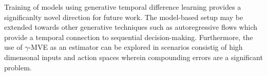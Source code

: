 \documentclass[11pt,letterpaper]{article}
\begin{document}
Training of models using generative temporal difference learning provides a significanlty novel direction for future work. The model-based setup may be extended towards other generative techniques such as autoregressive flows which provide a temporal connection to sequential decision-making. Furthermore, the use of $\gamma$-MVE as an estimator can be explored in scenarios consistig of high dimensonal inputs and action spaces wherein compounding errors are a significant problem. 
\end{document}
